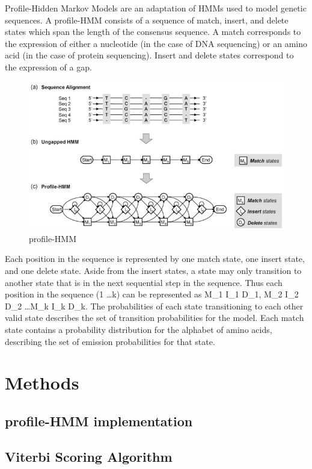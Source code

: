 \documentclass{article}
\begin{document}
Profile-Hidden Markov Models are an adaptation of HMMs used to model genetic sequences. A profile-HMM consists of a sequence of match, insert, and delete states which span the length of the consensus sequence. A match corresponds to the expression of either a nucleotide (in the case of DNA sequencing) or an amino acid (in the case of protein sequencing). Insert and delete states correspond to the expression of a gap. 
\begin{figure}[H]
\centering
\includegraphics[width=.8\textwidth]{materials/profile-HMM.png}
\caption{profile-HMM\footnotemark[1]}
\end{figure}
Each position in the sequence is represented by one match state, one insert state, and one delete state. Aside from the insert states, a state may only transition to another state that is in the next sequential step in the sequence. Thus each position in the sequence (1 \ldots k) can be represented as M_{1} I_{1} D_{1}, M_{2} I_{2} D_{2} \ldots M_{k} I_{k} D_{k}. The probabilities of each state transitioning to each other valid state describes the set of transition probabilities for the model. Each match state contains a probability distribution for the alphabet of amino acids, describing the set of emission probabilities for that state.

\section{Methods}


\subsection{profile-HMM implementation}


\subsection{Viterbi Scoring Algorithm}
\end{document}
